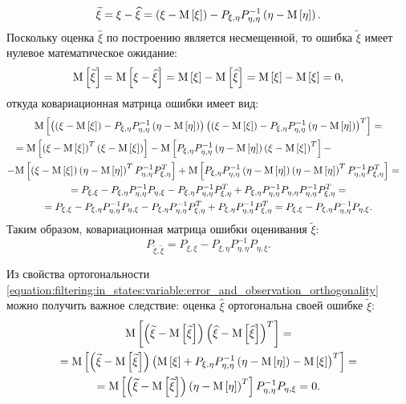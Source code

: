 $$
	\widetilde{\xi}
		= \xi - \widehat{\xi}
		= \left ( \xi - \mathrm{M} \left [ \xi \right ] \right ) - P_{\xi, \eta} P_{\eta, \eta}^{-1} \left ( \eta - \mathrm{M} \left [ \eta \right ] \right ) .
$$
Поскольку оценка $\widehat{\xi}$ по построению является несмещенной, то ошибка $\widetilde{\xi}$ имеет нулевое математическое ожидание:
$$
	\mathrm{M} \left [ \widetilde{\xi} \right ]
	= \mathrm{M} \left [ \xi - \widehat{\xi} \right ]
	= \mathrm{M} \left [ \xi \right ] - \mathrm{M} \left [ \widehat{\xi} \right ]
	= \mathrm{M} \left [ \xi \right ] - \mathrm{M} \left [ \xi \right ]
	= 0 ,
$$
откуда ковариационная матрица ошибки имеет вид:
\begin{multline*}
	\expectation{\left ( \centered{\xi} - P_{\xi,\eta} P_{\eta,\eta}^{-1} \centered{\eta} \right ) \left ( \centered{\xi} - P_{\xi,\eta} P_{\eta,\eta}^{-1} \centered{\eta} \right )^T} = \\
	\shoveleft{
		=
		\innerexpectation{\xi}{\xi}
		- \expectation{ P_{\xi,\eta} P_{\eta,\eta}^{-1} \centered{\eta} \centered{\xi}^T}
		-
	} \\
	\shoveright{
		- \expectation{\centered{\xi} \centered{\eta}^T P_{\eta,\eta}^{-1} P_{\xi,\eta}^T }
		+ \expectation{P_{\xi,\eta} P_{\eta,\eta}^{-1} \centered{\eta} \centered{\eta}^T P_{\eta,\eta}^{-1} P_{\xi,\eta}^T }
		=
	} \\
	= P_{\xi,\xi}
		- P_{\xi,\eta} P_{\eta,\eta}^{-1} P_{\eta,\xi}
		- P_{\xi,\eta} P_{\eta,\eta}^{-1} P_{\xi,\eta}^T
		+ P_{\xi,\eta} P_{\eta,\eta}^{-1} P_{\eta,\eta} P_{\eta,\eta}^{-1} P_{\xi,\eta}^T = \\
	= P_{\xi,\xi}
		- P_{\xi,\eta} P_{\eta,\eta}^{-1} P_{\eta,\xi}
		- P_{\xi,\eta} P_{\eta,\eta}^{-1} P_{\xi,\eta}^T
		+ P_{\xi,\eta} P_{\eta,\eta}^{-1} P_{\xi,\eta}^T
	= P_{\xi,\xi}
		- P_{\xi,\eta} P_{\eta,\eta}^{-1} P_{\eta,\xi} .
\end{multline*}
Таким образом, ковариационная матрица ошибки оценивания $\widetilde{\xi}$:
\begin{equation} \label{equation:filtering:in_states:variable:optimal_error_covariance}
	P_{\widetilde{\xi},\widetilde{\xi}} = P_{\xi,\xi} - P_{\xi,\eta} P_{\eta,\eta}^{-1} P_{\eta,\xi} .
\end{equation}

Из свойства ортогональности \eqref{equation:filtering:in_states:variable:error_and_observation_orthogonality} можно получить важное следствие: оценка $\widehat{\xi}$
ортогональна своей ошибке $\widetilde{\xi}$:
\begin{multline} \label{equation:filtering:in_states:variable:error_and_estimate_orthogonality}
	\mathrm{M} \left [ \left ( \widetilde{\xi} - \mathrm{M} \left [ \widetilde{\xi} \right ] \right ) \left ( \widehat{\xi} - \mathrm{M} \left [ \widehat{\xi} \right ] \right )^T \right ] = \\
	= \mathrm{M} \left [ \left ( \widetilde{\xi} - \mathrm{M} \left [ \widetilde{\xi} \right ] \right ) \left ( \mathrm{M} \left [ \xi \right ] + P_{\xi, \eta} P_{\eta, \eta}^{-1} \left ( \eta - \mathrm{M} \left [ \eta \right ] \right ) - \mathrm{M} \left [ \xi \right ] \right )^T \right ] = \\
	= \mathrm{M} \left [ \left ( \widetilde{\xi} - \mathrm{M} \left [ \widetilde{\xi} \right ] \right ) \left ( \eta - \mathrm{M} \left [ \eta \right ] \right )^T  \right ] P_{\eta, \eta}^{-1} P_{\eta, \xi}
	= 0
	.
\end{multline}


